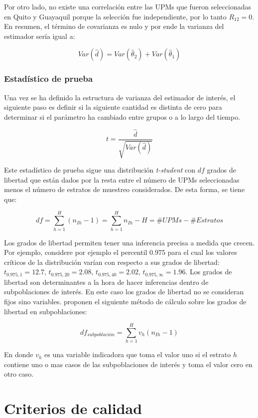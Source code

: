 \documentclass[12pt,spanish,]{book}
\begin{document}
Por otro lado, no existe una correlación entre las UPMs que fueron seleccionadas en Quito y Guayaquil porque la selección fue independiente, por lo tanto \(R_{12} = 0\). En resumen, el término de covarianza es nulo y por ende la varianza del estimador sería igual a:

\[
Var(\hat{d}) 
= Var(\hat{\theta}_2) + Var(\hat{\theta}_1)
\]

\hypertarget{estadistico-de-prueba}{%
\subsection{Estadístico de prueba}\label{estadistico-de-prueba}}

Una vez se ha definido la estructura de varianza del estimador de interés, el siguiente paso es definir si la siguiente cantidad es distinta de cero para determinar si el parámetro ha cambiado entre grupos o a lo largo del tiempo.

\[
t = \frac{\hat{d}}{\sqrt{Var(\hat{d})}}
\]

Este estadístico de prueba sigue una distribución \emph{t-student} con \(df\) grados de libertad que están dados por la resta entre el número de UPMs seleccionadas menos el número de estratos de muestreo considerados. De esta forma, se tiene que:

\[
df = \sum_{h=1}^H (n_{Ih} - 1) = \sum_{h=1}^H n_{Ih} - H = \#UPMs - \#Estratos
\]

Los grados de libertad permiten tener una inferencia precisa a medida que crecen. Por ejemplo, considere por ejemplo el percentil 0.975 para el cual los valores críticos de la distribución varían con respecto a sus grados de libertad: \(t_{0.975, 1}=12.7\), \(t_{0.975, 20}=2.08\), \(t_{0.975, 40}=2.02\), \(t_{0.975, \infty}=1.96\). Los grados de libertad son determinantes a la hora de hacer inferencias dentro de subpoblaciones de interés. En este caso los grados de libertad no se consideran fijos sino variables. \textcite{Korn_Graubard_1999} proponen el siguiente método de cálculo sobre los grados de libertad en subpoblaciones:

\[
df_{subpoblación} = \sum_{h=1}^H v_h(n_{Ih} - 1)
\]

En donde \(v_h\) es una variable indicadora que toma el valor uno si el estrato \(h\) contiene uno o mas casos de las subpoblaciones de interés y toma el valor cero en otro caso.

\hypertarget{criterios-de-calidad}{%
\chapter{Criterios de calidad}\label{criterios-de-calidad}}
\end{document}
